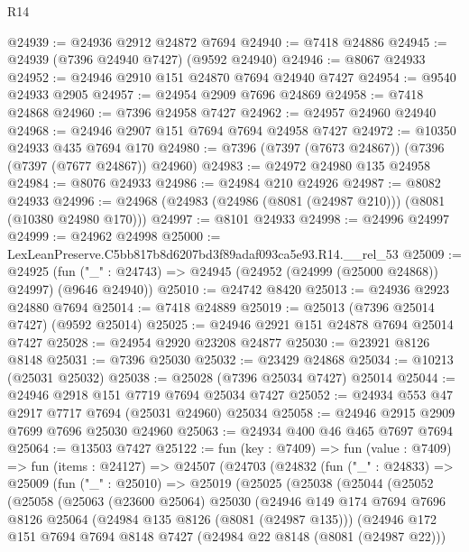\begin{lexlean}{R14}
\begin{coremodule}
@24939 := @24936 @2912 @24872 @7694
@24940 := @7418 @24886
@24945 := @24939 (@7396 @24940 @7427) (@9592 @24940)
@24946 := @8067 @24933
@24952 := @24946 @2910 @151 @24870 @7694 @24940 @7427
@24954 := @9540 @24933 @2905
@24957 := @24954 @2909 @7696 @24869
@24958 := @7418 @24868
@24960 := @7396 @24958 @7427
@24962 := @24957 @24960 @24940
@24968 := @24946 @2907 @151 @7694 @7694 @24958 @7427
@24972 := @10350 @24933 @435 @7694 @170
@24980 := @7396 (@7397 (@7673 @24867)) (@7396 (@7397 (@7677 @24867)) @24960)
@24983 := @24972 @24980 @135 @24958
@24984 := @8076 @24933
@24986 := @24984 @210 @24926
@24987 := @8082 @24933
@24996 := @24968 (@24983 (@24986 (@8081 (@24987 @210))) (@8081 (@10380 @24980 @170)))
@24997 := @8101 @24933
@24998 := @24996 @24997
@24999 := @24962 @24998
@25000 := LexLeanPreserve.C5bb817b8d6207bd3f89adaf093ca5e93.R14.__rel_53
@25009 := @24925
    (fun ("_" : @24743) => @24945 (@24952 (@24999 (@25000 @24868)) @24997) (@9646 @24940))
@25010 := @24742 @8420
@25013 := @24936 @2923 @24880 @7694
@25014 := @7418 @24889
@25019 := @25013 (@7396 @25014 @7427) (@9592 @25014)
@25025 := @24946 @2921 @151 @24878 @7694 @25014 @7427
@25028 := @24954 @2920 @23208 @24877
@25030 := @23921 @8126 @8148
@25031 := @7396 @25030
@25032 := @23429 @24868
@25034 := @10213 (@25031 @25032)
@25038 := @25028 (@7396 @25034 @7427) @25014
@25044 := @24946 @2918 @151 @7719 @7694 @25034 @7427
@25052 := @24934 @553 @47 @2917 @7717 @7694 (@25031 @24960) @25034
@25058 := @24946 @2915 @2909 @7699 @7696 @25030 @24960
@25063 := @24934 @400 @46 @465 @7697 @7694
@25064 := @13503 @7427
@25122 := fun (key : @7409) =>
  fun (value : @7409) =>
  fun (items : @24127) =>
  @24507
    (@24703
      (@24832
        (fun ("_" : @24833) =>
        @25009
          (fun ("_" : @25010) =>
          @25019
            (@25025
              (@25038
                (@25044
                  (@25052
                    (@25058
                      (@25063
                        (@23600 @25064)
                        @25030
                        (@24946
                          @149
                          @174
                          @7694
                          @7696
                          @8126
                          @25064
                          (@24984 @135 @8126 (@8081 (@24987 @135)))
                          (@24946
                            @172
                            @151
                            @7694
                            @7694
                            @8148
                            @7427
                            (@24984 @22 @8148 (@8081 (@24987 @22)))

\end{coremodule}
\end{lexlean}
